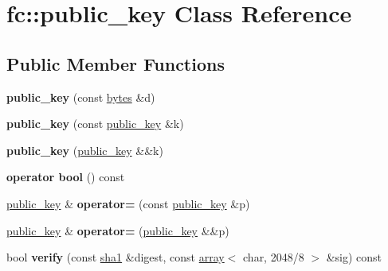 \hypertarget{classfc_1_1public__key}{}\section{fc\+:\+:public\+\_\+key Class Reference}
\label{classfc_1_1public__key}
\subsection*{Public Member Functions}
\begin{DoxyCompactItemize}
\item 
\mbox{\label{classfc_1_1public__key_a4c88ccadf891b6bec9028f3a1fb14c3c}} 
{\bfseries public\+\_\+key} (const \mbox{\hyperlink{classstd_1_1vector}{bytes}} \&d)
\item 
\mbox{\label{classfc_1_1public__key_ad624a05c27f37e50c9f349f1b8c94869}} 
{\bfseries public\+\_\+key} (const \mbox{\hyperlink{classfc_1_1public__key}{public\+\_\+key}} \&k)
\item 
\mbox{\label{classfc_1_1public__key_a1f25146492883321afc46035f999c072}} 
{\bfseries public\+\_\+key} (\mbox{\hyperlink{classfc_1_1public__key}{public\+\_\+key}} \&\&k)
\item 
\mbox{\label{classfc_1_1public__key_a77d99a8691b5df020d1f958fe0a29104}} 
{\bfseries operator bool} () const
\item 
\mbox{\label{classfc_1_1public__key_afe5228f2e38f14701911eac577f4da85}} 
\mbox{\hyperlink{classfc_1_1public__key}{public\+\_\+key}} \& {\bfseries operator=} (const \mbox{\hyperlink{classfc_1_1public__key}{public\+\_\+key}} \&p)
\item 
\mbox{\label{classfc_1_1public__key_add48eb28c65a78c8555121793a74d08e}} 
\mbox{\hyperlink{classfc_1_1public__key}{public\+\_\+key}} \& {\bfseries operator=} (\mbox{\hyperlink{classfc_1_1public__key}{public\+\_\+key}} \&\&p)
\item 
\mbox{\label{classfc_1_1public__key_a9fa1c5e971398454159143fcbc4c4e52}} 
bool {\bfseries verify} (const \mbox{\hyperlink{classfc_1_1sha1}{sha1}} \&digest, const \mbox{\hyperlink{classfc_1_1array}{array}}$<$ char, 2048/8 $>$ \&sig) const

\end{DoxyCompactItemize}
